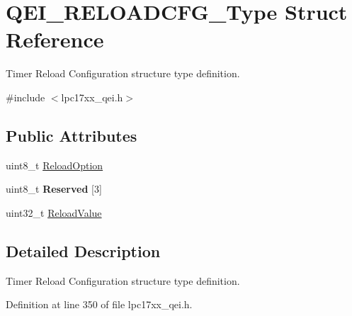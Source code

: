 \hypertarget{struct_q_e_i___r_e_l_o_a_d_c_f_g___type}{\section{\-Q\-E\-I\-\_\-\-R\-E\-L\-O\-A\-D\-C\-F\-G\-\_\-\-Type \-Struct \-Reference}
\label{struct_q_e_i___r_e_l_o_a_d_c_f_g___type}
}


\-Timer \-Reload \-Configuration structure type definition.  




{\ttfamily \#include $<$lpc17xx\-\_\-qei.\-h$>$}

\subsection*{\-Public \-Attributes}
\begin{DoxyCompactItemize}
\item 
uint8\-\_\-t \hyperlink{struct_q_e_i___r_e_l_o_a_d_c_f_g___type_a316562ce9dc94c6c32a872d51cf1ff8f}{\-Reload\-Option}
\item 
\hypertarget{struct_q_e_i___r_e_l_o_a_d_c_f_g___type_a1ba78022c8ede06b9badd6ccc4277730}{uint8\-\_\-t {\bfseries \-Reserved} \mbox{[}3\mbox{]}}\label{struct_q_e_i___r_e_l_o_a_d_c_f_g___type_a1ba78022c8ede06b9badd6ccc4277730}

\item 
uint32\-\_\-t \hyperlink{struct_q_e_i___r_e_l_o_a_d_c_f_g___type_a0c2ce04ffde5366bd42e73cf7136a2f1}{\-Reload\-Value}
\end{DoxyCompactItemize}


\subsection{\-Detailed \-Description}
\-Timer \-Reload \-Configuration structure type definition. 

\-Definition at line 350 of file lpc17xx\-\_\-qei.\-h.



